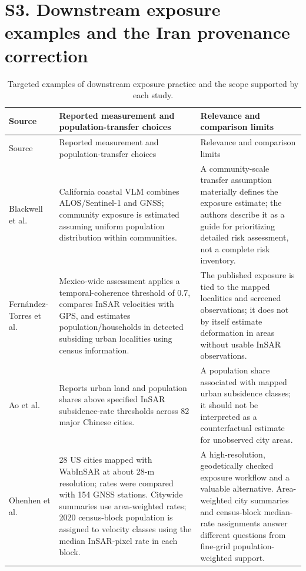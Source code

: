 \documentclass[10pt,a4paper]{article}
\begin{document}
\section*{S3. Downstream exposure examples and the Iran provenance correction}
\small
\begin{longtable}{p{.24\linewidth}p{.38\linewidth}p{.3\linewidth}}
\caption{Targeted examples of downstream exposure practice and the scope supported by each study.}\\
\toprule Source & Reported measurement and population-transfer choices & Relevance and comparison limits\\\midrule\endfirsthead
\toprule Source & Reported measurement and population-transfer choices & Relevance and comparison limits\\\midrule\endhead
Blackwell et al. \citep{blackwell2020california} & California coastal VLM combines ALOS/Sentinel-1 and GNSS; community exposure is estimated assuming uniform population distribution within communities. & A community-scale transfer assumption materially defines the exposure estimate; the authors describe it as a guide for prioritizing detailed risk assessment, not a complete risk inventory.\\
Fern\'andez-Torres et al. \citep{fernandeztorres2024mexico} & Mexico-wide assessment applies a temporal-coherence threshold of 0.7, compares InSAR velocities with GPS, and estimates population/households in detected subsiding urban localities using census information. & The published exposure is tied to the mapped localities and screened observations; it does not by itself estimate deformation in areas without usable InSAR observations.\\
Ao et al. \citep{ao2024national} & Reports urban land and population shares above specified InSAR subsidence-rate thresholds across 82 major Chinese cities. & A population share associated with mapped urban subsidence classes; it should not be interpreted as a counterfactual estimate for unobserved city areas.\\
Ohenhen et al. \citep{ohenhen2025uscities} & 28 US cities mapped with WabInSAR at about 28-m resolution; rates were compared with 154 GNSS stations. Citywide summaries use area-weighted rates; 2020 census-block population is assigned to velocity classes using the median InSAR-pixel rate in each block. & A high-resolution, geodetically checked exposure workflow and a valuable alternative. Area-weighted city summaries and census-block median-rate assignments answer different questions from fine-grid population-weighted support.\\

\end{longtable}
\end{document}
